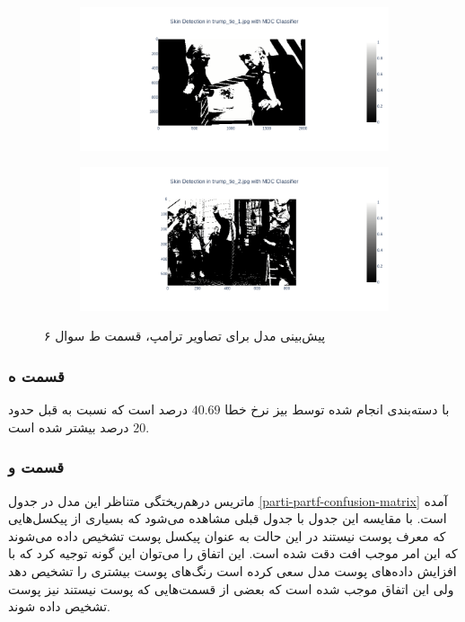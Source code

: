 \documentclass{article}
\begin{document}
\begin{figure}[h]
    \begin{subfigure}{.45\linewidth}
        \centering
        \includegraphics[width=\linewidth]{images/q6/parti_trump_partd.png}
    \end{subfigure}
    \hfill
    \begin{subfigure}{.45\linewidth}
        \centering
        \includegraphics[width=\linewidth]{images/q6/parti_trump_partd2.png}
    \end{subfigure}
    \caption{پیش‌بینی مدل  برای تصاویر ترامپ، قسمت ط سوال ۶}
    \label{parti-partd-trump-skin}
\end{figure}

\subsubsection*{قسمت ه}

با دسته‌بندی انجام شده توسط بیز نرخ خطا $40.69$ درصد است که نسبت به قبل حدود $20$ درصد بیشتر شده است.

\subsubsection*{قسمت و}

ماتریس در‌هم‌ریختگی متناظر این مدل در جدول \ref{parti-partf-confusion-matrix} آمده است.
با مقایسه این جدول با جدول قبلی مشاهده می‌شود که بسیاری از پیکسل‌هایی که معرف پوست نیستند در این حالت
به عنوان پیکسل پوست تشخیص داده می‌شوند که این امر موجب افت دقت شده است. این اتفاق را می‌توان این گونه توجیه کرد
که با افزایش داده‌های پوست مدل سعی کرده است رنگ‌های پوست بیشتری را تشخیص دهد ولی این اتفاق موجب شده است که
بعضی از قسمت‌هایی که پوست نیستند نیز پوست تشخیص داده شوند.
\end{document}
